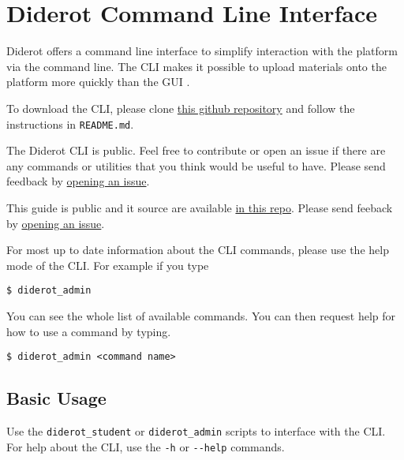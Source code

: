 \chapter{Diderot Command Line Interface}
\label{ch:cli}

Diderot offers a command line interface to simplify interaction with
the platform via the command line.
%
The CLI makes it possible to upload materials onto the platform more quickly than the GUI .

\begin{important}


To download the CLI, please clone 
%
\href{https://github.com/diderot-edu/diderot-cli}{this github repository}
%
and follow the instructions in \lstinline`README.md`. 

The Diderot CLI is public. Feel free to contribute or open an issue if there
are any commands or utilities that you think would be useful to have.
%
Please send feedback by 
\href{https://github.com/diderot-edu/diderot-cli/issues}{opening an issue}.

This guide is public and it source are available 
\href{https://github.com/diderot-edu/diderot-guide}{in this repo}.
%
Please send feeback by \href{https://github.com/diderot-edu/diderot-guide/issues}{opening an issue}.
\end{important}

\begin{important}
For most up to date information about the CLI commands, please use the
help mode of the CLI. For example if you type 

\begin{lstlisting}
$ diderot_admin
\end{lstlisting}

You can see the whole list of available commands.  You can then
request help for how to use a command by typing.
\begin{lstlisting}
$ diderot_admin <command name>
\end{lstlisting}

\end{important}

\section{Basic Usage}

Use the \verb|diderot_student| or \verb|diderot_admin| scripts to interface with the CLI.
%
For help about the CLI, use the \verb|-h| or \verb|--help| commands.

